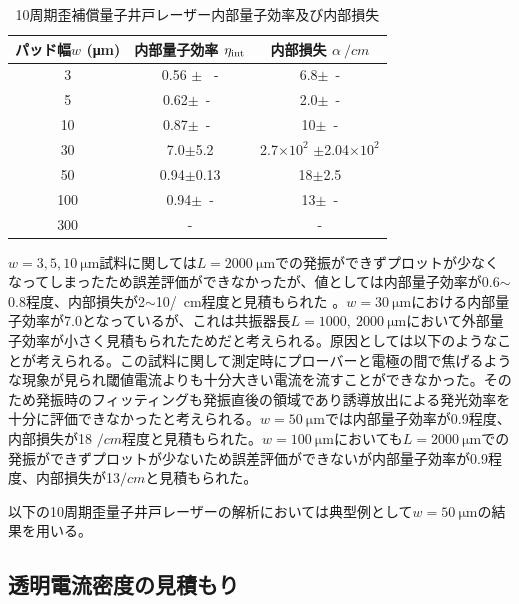 {\begin{table}[h]
  \caption{10周期歪補償量子井戸レーザー内部量子効率及び内部損失}
  \label{table:table_10QW_i_int}
  \centering
  \begin{tabular}{ccc}
    \hline
    パッド幅$w$ (\si{\micro\metre})  &  内部量子効率 $\eta_{\rm{int}} $ &内部損失 $\alpha\ \si{/cm} $ \\
    \hline \hline
     3 & 0.56 $\pm$ \ -  & 6.8$\pm$\ - \\
    5  & 0.62$\pm$\ -\ &2.0$\pm$\ -\\
    10  & 0.87$\pm$\ -\  & 10$\pm$\ -\\ 
    30& 7.0$\pm$5.2& 2.7$\times 10^2$ $\pm$2.04$\times 10^2$\\
    50& 0.94$\pm$0.13&18$\pm$2.5 \\
    100& 0.94$\pm$\ -& 13$\pm$\ -\\
    300&- &-\\
    \hline
  \end{tabular}
\end{table}



$w=3, 5, 10\  \si{\micro\metre}$試料に関しては$L=2000\ \si{\micro\metre}$での発振ができずプロットが少なくなってしまったため誤差評価ができなかったが、値としては内部量子効率が0.6$\sim$0.8程度、内部損失が2$\sim$10\si{/cm}程度と見積もられた
。$w=30\ \si{\micro\metre}$における内部量子効率が7.0となっているが、これは共振器長$L=1000,\  2000\ \si{\micro\metre}$において外部量子効率が小さく見積もられたためだと考えられる。原因としては以下のようなことが考えられる。この試料に関して測定時にプローバーと電極の間で焦げるような現象が見られ閾値電流よりも十分大きい電流を流すことができなかった。そのため発振時のフィッティングも発振直後の領域であり誘導放出による発光効率を十分に評価できなかったと考えられる。$w=50\ \si{\micro\metre}$では内部量子効率が0.9程度、内部損失が18 $\si{/cm}$程度と見積もられた。$w=100\ \si{\micro\metre}$においても$L=2000\ \si{\micro\metre}$での発振ができずプロットが少ないため誤差評価ができないが内部量子効率が0.9程度、内部損失が13$\si{/cm}$と見積もられた。

以下の10周期歪量子井戸レーザーの解析においては典型例として$w=50\ \si{ \micro\metre}$の結果を用いる。

\clearpage
\subsection{透明電流密度の見積もり}

}
